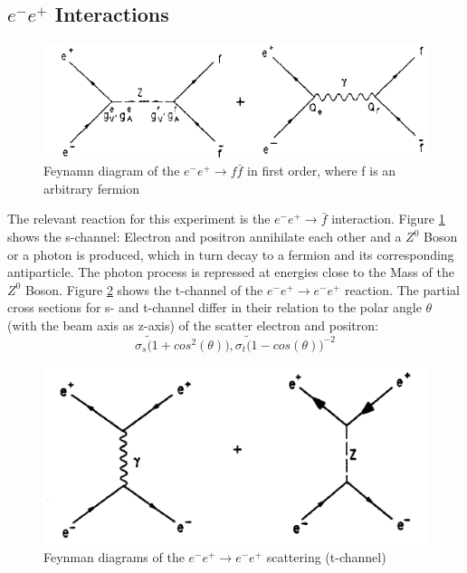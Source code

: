 \subsection{$e^-e^+$ Interactions}
\begin{figure}[ht]
	\centering
	\includegraphics{graphics/annihilation.png}
	\caption{Feynamn diagram of the $e^-e^+ \rightarrow f\bar{f}$ in first order, where f is an arbitrary fermion}
	\label{fig:principles:annihilation.png}
\end{figure}
The relevant reaction for this experiment is the $e^-e^+\rightarrow\bar{f}$ interaction. Figure \ref{fig:principles:annihilation.png} shows the s-channel: Electron and positron annihilate each other and a $Z^0$ Boson or a photon is produced, which in turn decay to a fermion and its corresponding antiparticle. The photon process is repressed at energies close to the Mass of the $Z^0$ Boson.%
Figure \ref{fig:principles:BhabbaStreuung.png} shows the t-channel of the  $e^-e^+ \rightarrow e^-e^+$ reaction. The partial cross sections for s- and t-channel differ in their relation to the polar angle $\theta$ (with the beam axis as z-axis) of the scatter electron and positron:
\begin{equation}
\sigma_s \tilde (1+cos^2(\theta)), \sigma_t \tilde (1-cos(\theta))^{-2}
\end{equation}
\begin{figure}[hb]
	\centering
	\includegraphics{graphics/BhabbaStreuung.png}
	\caption{Feynman diagrams of the $e^-e^+ \rightarrow e^-e^+$ scattering (t-channel)}
	\label{fig:principles:BhabbaStreuung.png}
\end{figure}

